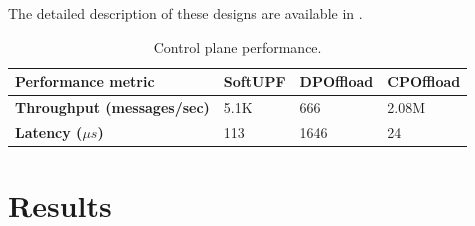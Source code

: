 The detailed description of these designs are available in \cite{}.
\begin{table}[htbp]
\begin{scriptsize}
\begin{center}
\def\arraystretch{1.5}%
\begin{tabular}{|p{3cm}|p{2cm}|p{2cm}|p{2cm}|}\hline 
{\bf{Performance metric}} & {\bf{SoftUPF}} & {\bf{DPOffload}} & {\bf{CPOffload}} \\ \hline 
{\bf{Throughput (messages/sec)}} & 5.1K  & 666  & 2.08M  \\ \hline
{\bf{Latency ($\mu s$)}} & 113  & 1646  & 24 \\ \hline
\end{tabular}
\caption{Control plane performance.} 
\label{tab:perf-cp-offload}
\end{center}
\end{scriptsize}
\end{table}

\section{Results}
